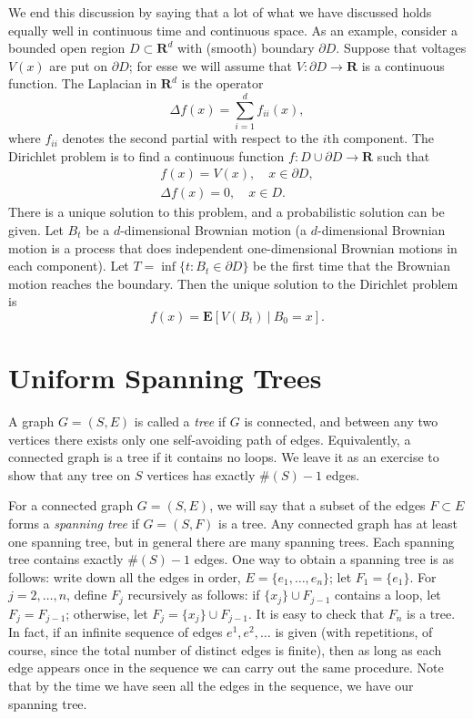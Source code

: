\documentclass{stml-l}
\theoremstyle{definition}
\numberwithin{equation}{chapter}
\numberwithin{figure}{chapter}
\numberwithin{figure}{section}
\begin{document}
We end this discussion by saying that a lot of what we have
discussed holds equally well in continuous time and continuous
space. As an example, consider a bounded open region $D\subset
\mathbf{R}^{d}$ with (smooth) boundary $\partial D$. Suppose that
voltages $V(x)$ are put on $\partial D$; for esse we will assume
that $V : \partial D\rightarrow \mathbf{R}$ is a continuous
function. The Laplacian in $\mathbf{R}^{d}$ is the operator
\begin{equation*}
\Delta f(x)=\sum\limits_{i=1}^{d}f_{ii}(x),
\end{equation*}
where $f_{ii}$ denotes the second partial with respect to the $i$th
component. The Dirichlet problem is to find a continuous function
$f:D\cup\partial D\rightarrow \mathbf{R}$ such that
\begin{gather*}
f(x)=V(x),\quad x\in\partial D,\\
\Delta f(x)=0,\quad x\in D.
\end{gather*}
There is a unique solution to this problem, and a probabilistic
solution can be given. Let $B_{t}$ be a $d$-dimensional Brownian
motion (a $d$-dimensional Brownian motion is a process that does
independent one-dimensional Brownian motions in each component). Let
$T=\inf\{t:B_{t}\in\partial D\}$ be the first time that the Brownian
motion reaches the boundary. Then the unique solution to the
Dirichlet problem is
\begin{equation*}
f(x)=\mathbf{E}[V(B_{t})\ |\ B_{0}=x].
\end{equation*}


\chapter{Uniform Spanning Trees\label{ch10:chap10}}

A graph $G=(S,E)$ is called a \emph{tree} if $G$ is connected, and
between any two vertices there exists only one self-avoiding path of
edges. Equivalently, a connected graph is a tree if it contains no
loops. We leave it as an exercise to show that any tree on $S$
vertices has exactly $\#(S)-1$ edges.

For a connected graph $G=(S,E)$, we will say that a subset of the
edges $F\subset E$ forms a \emph{spanning tree} if $G=(S,F)$ is a
tree. Any connected graph has at least one spanning tree, but in
general there are many spanning trees. Each spanning tree contains
exactly $\#(S)-1$ edges. One way to obtain a spanning tree is as
follows: write down all the edges in order,
$E=\{e_{1},\ldots,e_{n}\}$; let $F_{1}=\{e_{1}\}$. For
$j=2,\ldots,n$, define $F_{j}$ recursively as follows: if
$\{x_{j}\}\cup F_{j-1}$ contains a loop, let $F_{j}=F_{j-1}$;
otherwise, let $F_{j}=\{x_{j}\}\cup F_{j-1}$. It is easy to check
that $F_{n}$ is a tree. In fact, if an infinite sequence of edges
$e^{1},e^{2},\ldots$ is given (with repetitions, of course, since
the total number of distinct edges is finite), then as long as each
edge appears once in the sequence we can carry out the same
procedure. Note that by the time we have seen all the edges in the
sequence, we have our spanning tree.
\end{document}
